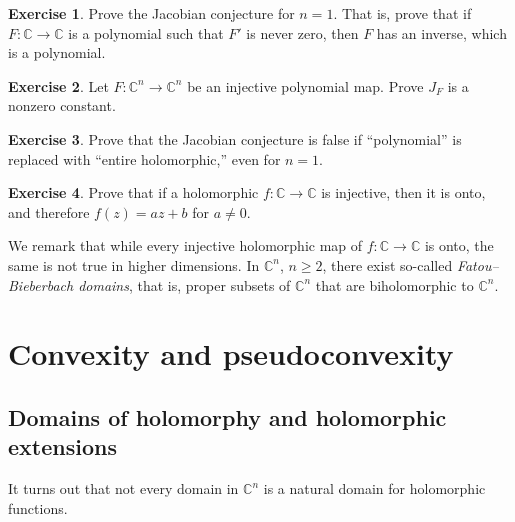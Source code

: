 \documentclass[12pt,openany]{book}
\newcommand{\C}{{\mathbb{C}}}
\theoremstyle{plain}
\theoremstyle{remark}
\theoremstyle{definition}
\newenvironment{exbox}{%
    \def\FrameCommand{\vrule width 1pt \relax\hspace{10pt}}%
    \MakeFramed{\advance\hsize-\width\FrameRestore}%
}{%
    \endMakeFramed
}
\theoremstyle{exercise}
\newtheorem{exercise}{Exercise}[section]
\theoremstyle{example}
\begin{document}
\begin{exbox}
\begin{exercise}
Prove the Jacobian conjecture for $n=1$.  That is, prove that if
$F \colon \C \to \C$ is a polynomial such that $F'$ is never zero,
then $F$ has an inverse, which is a polynomial.
\end{exercise}

\begin{exercise}
Let $F \colon \C^n \to \C^n$ be an injective polynomial map.
Prove $J_F$ is a nonzero constant.
\end{exercise}

\begin{exercise}
Prove that the Jacobian conjecture is false if
``polynomial'' is replaced with ``entire holomorphic,'' even for $n=1$.
\end{exercise}

\begin{exercise}
Prove that if a holomorphic $f \colon \C \to \C$ is injective, then it is
onto, and therefore $f(z) = az + b$ for $a \not= 0$.
\end{exercise}
\end{exbox}

We remark that while every injective holomorphic
map of $f \colon \C \to \C$ is onto, the same is not true in higher
dimensions.
In $\C^n$, $n \geq 2$, there exist so-called
\emph{Fatou--Bieberbach domains},
that is, proper subsets of $\C^n$ that are biholomorphic to $\C^n$.



\chapter{Convexity and pseudoconvexity} \label{ch:convexity}


\section{Domains of holomorphy and holomorphic extensions}

It turns out that not every domain in $\C^n$ is a natural domain for
holomorphic functions.
\end{document}
